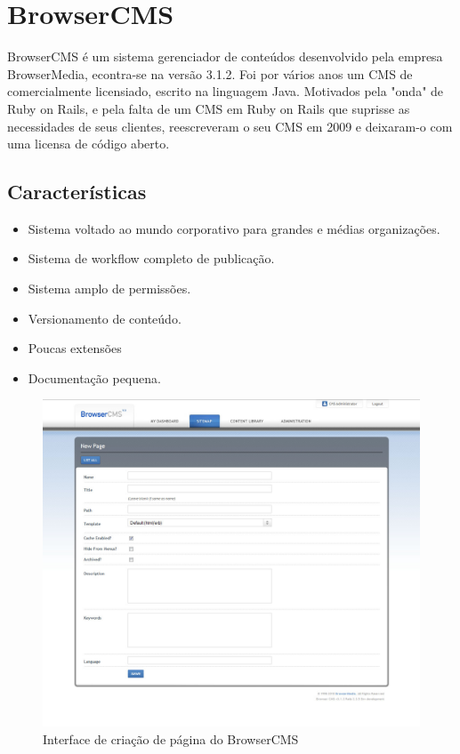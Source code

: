 \section{BrowserCMS}

BrowserCMS é um sistema gerenciador de conteúdos desenvolvido pela empresa BrowserMedia, econtra-se na versão 3.1.2. Foi por vários anos um CMS de comercialmente licensiado, escrito na linguagem Java. Motivados pela "onda" de Ruby on Rails, e pela falta de um CMS em Ruby on Rails que suprisse as necessidades de seus clientes, reescreveram o seu CMS em 2009 e deixaram-o com uma licensa de código aberto.

\subsection{Características}

\begin{itemize}
  \item Sistema voltado ao mundo corporativo para grandes e médias organizações.
  \item Sistema de workflow completo de publicação.
  \item Sistema amplo de permissões.
  \item Versionamento de conteúdo.
  \item Poucas extensões 
  \item Documentação pequena.
\end{itemize}

\begin{figure}[here]
\includegraphics[width=150mm]{images/browser_cms_new_page.jpg}
\caption{Interface de criação de página do BrowserCMS}
\label{fig:browsercms_new_page.png}
\end{figure}

